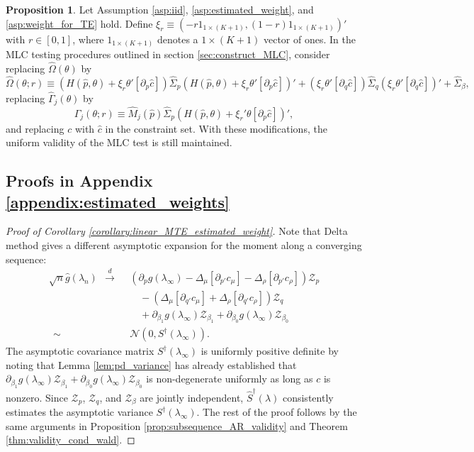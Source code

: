 \documentclass[11pt]{article}
\theoremstyle{definition}
\newtheorem{proposition}{Proposition}[section]
\newcommand{\0}{\ensuremath{\mathbf{0}}}
\newcommand{\normal}{\ensuremath{\mathcal{N}}}
\begin{document}
\begin{bibunit}
\begin{proposition}
\label{prop:MLC_validity_est_weight}
Let Assumption \ref{asp:iid}, \ref{asp:estimated_weight}, and \ref{asp:weight_for_TE} hold. Define $\xi_r \equiv (-r1_{1\times (K+1)}, (1-r)1_{1\times (K+1)})'$ with $r\in [0,1]$, where $1_{1\times (K+1)}$ denotes a $1\times (K+1)$ vector of ones. 
In the MLC testing procedures outlined in section \ref{sec:construct_MLC}, consider replacing $\hat{\Omega}(\theta)$ by 
\[
    \hat{\Omega}(\theta; r) \equiv \left(H(\hat{p},\theta) + \xi_r\theta' [\partial_p \hat{c}]\right) \hat{\Sigma}_p \left(H(\hat{p},\theta) + \xi_r\theta' [\partial_p \hat{c}]\right)' + (\xi_r\theta'[\partial_q \hat{c}])\hat{\Sigma}_q (\xi_r\theta'[\partial_q \hat{c}])' + \hat{\Sigma}_\beta,
\]
replacing $\hat{\Gamma}_{j}(\theta)$ by
\[
    \hat{\Gamma}_{j}(\theta; r) \equiv \hat{M}_j(\hat{p}) \hat{\Sigma}_p \left(H(\hat{p},\theta) + \xi_r'\theta [\partial_p \hat{c}]\right)',
\]
and replacing $c$ with $\hat{c}$ in the constraint set. With these modifications, the uniform validity of the MLC test is still maintained.
\end{proposition}




\subsection{Proofs in Appendix \ref{appendix:estimated_weights}}


%
\begin{proof}[Proof of Corollary \ref{corollary:linear_MTE_estimated_weight}]
Note that Delta method gives a different asymptotic expansion for the moment along a converging sequence:
\begin{align*}
    \sqrt{n}\hat{g}(\lambda_{n}) 
    ~~\xrightarrow{d}~~&  \left(\partial_pg(\lambda_\infty) - \Delta_\mu[\partial_{p'} c_\mu] - \Delta_\rho [\partial_{p'}c_\rho]\right) \mathcal{Z}_p  \\
    & \quad - \left(\Delta_\mu [\partial_{q'}c_\mu] + \Delta_{\rho}[\partial_{q'}c_\rho]\right)\mathcal{Z}_q \\
    & \quad + \partial_{\beta_1} g(\lambda_\infty) 
    \mathcal{Z}_{\beta_1} + \partial_{\beta_0} g(\lambda_\infty) \mathcal{Z}_{\beta_0} \\
    ~~\sim~~& \normal(0, S^\dagger(\lambda_\infty)).
\end{align*}
The asymptotic covariance matrix $S^\dagger(\lambda_\infty)$ is uniformly positive definite by noting that Lemma \ref{lem:pd_variance} has already established that $\partial_{\beta_1} g(\lambda_\infty) \mathcal{Z}_{\beta_1} + \partial_{\beta_0} g(\lambda_\infty)\mathcal{Z}_{\beta_0}$ is non-degenerate uniformly as long as $c$ is nonzero. Since $\mathcal{Z}_p$, $\mathcal{Z}_q$, and $\mathcal{Z}_\beta$ are jointly independent, $\hat{S}^\dagger(\lambda)$ consistently estimates the asymptotic variance $S^\dagger(\lambda_\infty)$. The rest of the proof follows by the same arguments in Proposition \ref{prop:subsequence_AR_validity} and Theorem \ref{thm:validity_cond_wald}.
\end{proof}





\end{bibunit}
\end{document}

